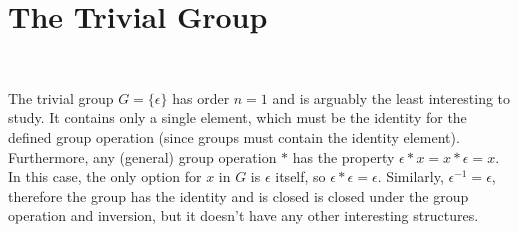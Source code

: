 \section{The Trivial Group}~\label{sec:trivial}

The trivial group $G = \{ \epsilon \}$ has order $n = 1$
and is arguably the least interesting to study.
It contains only a single element, which must be the identity for the defined group operation
(since groups must contain the identity element).
Furthermore, any (general) group operation $*$ has the property
$\epsilon * x = x * \epsilon = x$.
In this case, the only option for $x$ in $G$ is $\epsilon$ itself,
so $\epsilon * \epsilon = \epsilon$.
Similarly, $\epsilon^{-1} = \epsilon$, therefore the group
has the identity and is closed is closed under the group operation and inversion,
but it doesn't have any other interesting structures.
